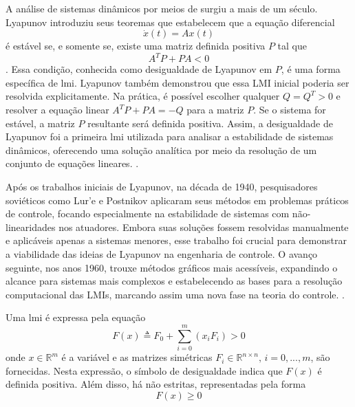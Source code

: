A análise de sistemas dinâmicos por meios de  surgiu a mais de um século. Lyapunov introduziu seus teoremas que estabelecem que a equação diferencial \begin{equation}\dot{x}(t) = Ax(t)\end{equation} é estável se, e somente se, existe uma matriz definida positiva $P$ tal que \begin{equation}A^T P + P A < 0\end{equation} \cite{lyapunov1892}. Essa condição, conhecida como desigualdade de Lyapunov em $P$, é uma forma específica de \acrshort{lmi}. Lyapunov também demonstrou que essa LMI inicial poderia ser resolvida explicitamente. Na prática, é possível escolher qualquer $Q = Q^T > 0$ e resolver a equação linear $A^T P + P A = -Q$ para a matriz $P$. Se o sistema for estável, a matriz $P$ resultante será definida positiva. Assim, a desigualdade de Lyapunov foi a primeira \acrshort{lmi} utilizada para analisar a estabilidade de sistemas dinâmicos, oferecendo uma solução analítica por meio da resolução de um conjunto de equações lineares. \cite{lyapunov1892,boyd1994}.

Após os trabalhos iniciais de Lyapunov, na década de 1940, pesquisadores soviéticos como Lur'e e Postnikov aplicaram seus métodos em problemas práticos de controle, focando especialmente na estabilidade de sistemas com não-linearidades nos atuadores. Embora suas soluções fossem resolvidas manualmente e aplicáveis apenas a sistemas menores, esse trabalho foi crucial para demonstrar a viabilidade das ideias de Lyapunov na engenharia de controle. O avanço seguinte, nos anos 1960, trouxe métodos gráficos mais acessíveis, expandindo o alcance para sistemas mais complexos e estabelecendo as bases para a resolução computacional das LMIs, marcando assim uma nova fase na teoria do controle. \cite{boyd1994}.

Uma \acrshort{lmi} é expressa pela equação \begin{equation} F(x) \triangleq F_0 + \sum_{i=0}^{m}(x_iF_i) > 0 \label{eq:lmi1}\end{equation} onde $x \in \mathbb{R}^m$ é a variável e as matrizes simétricas $F_i \in \mathbb{R}^{n \times n}, \, i = 0, . . . , m$, são fornecidas. Nesta expressão, o símbolo de desigualdade indica que $F(x)$ é definida positiva. Além disso, há  não estritas, representadas pela forma \begin{equation} F(x) \geq 0 \end{equation}

